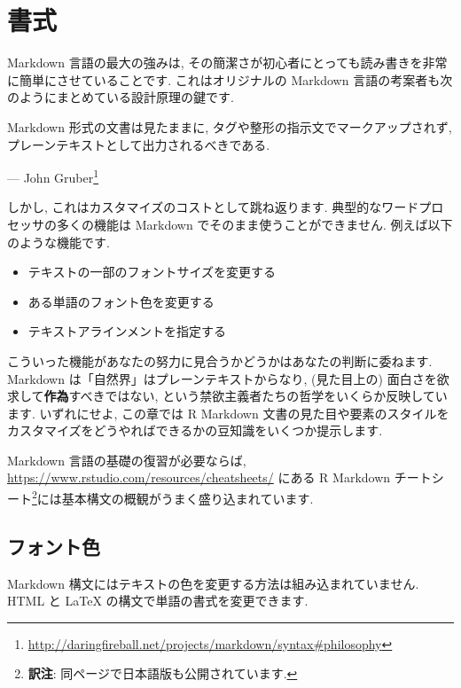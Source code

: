 \documentclass[
  11pt,
  lualatex,ja=standard,jafont=noto]{bxjsreport}
\renewenvironment{quote}{\def\FrameCommand{{\color{quotebarcolor}{\vrule width 3pt}}\hspace{10pt}}\MakeFramed{\advance\hsize-\width\FrameRestore}}{\endMakeFramed}
\renewcommand{\href}[2]{#2\footnote{\url{#1}}}
\begin{document}
\hypertarget{formatting}{%
\chapter{書式}\label{formatting}}

Markdown 言語の最大の強みは, その簡潔さが初心者にとっても読み書きを非常に簡単にさせていることです. これはオリジナルの Markdown 言語の考案者も次のようにまとめている設計原理の鍵です.

\begin{quote}
Markdown 形式の文書は見たままに, タグや整形の指示文でマークアップされず, プレーンテキストとして出力されるべきである.

\begin{flushright}
--- \href{http://daringfireball.net/projects/markdown/syntax\#philosophy}{John Gruber}

\end{flushright}
\end{quote}

しかし, これはカスタマイズのコストとして跳ね返ります. 典型的なワードプロセッサの多くの機能は Markdown でそのまま使うことができません. 例えば以下のような機能です.

\begin{itemize}
\item
  テキストの一部のフォントサイズを変更する
\item
  ある単語のフォント色を変更する
\item
  テキストアラインメントを指定する
\end{itemize}

こういった機能があなたの努力に見合うかどうかはあなたの判断に委ねます. Markdown は「自然界」はプレーンテキストからなり, (見た目上の) 面白さを欲求して\textbf{作為}すべきではない, という禁欲主義者たちの哲学をいくらか反映しています. いずれにせよ, この章では R Markdown 文書の見た目や要素のスタイルをカスタマイズをどうやればできるかの豆知識をいくつか提示します.

Markdown 言語の基礎の復習が必要ならば, \url{https://www.rstudio.com/resources/cheatsheets/} にある R Markdown チートシート\footnote{\textbf{訳注}: 同ページで日本語版も公開されています.}には基本構文の概観がうまく盛り込まれています.

\hypertarget{font-color}{%
\section{フォント色}\label{font-color}}

Markdown 構文にはテキストの色を変更する方法は組み込まれていません. HTML と LaTeX の構文で単語の書式を変更できます.
\end{document}
